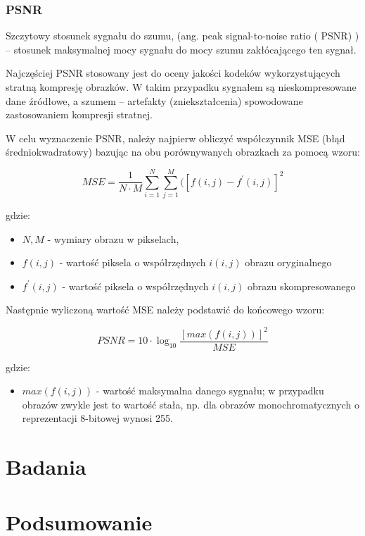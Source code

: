 \documentclass{article}
\begin{document}
\subsubsection{PSNR}

Szczytowy stosunek sygnału do szumu, (ang. peak signal-to-noise ratio ( PSNR) ) – stosunek maksymalnej mocy sygnału do mocy szumu zakłócającego ten sygnał.  

Najczęściej PSNR stosowany jest do oceny jakości kodeków wykorzystujących stratną kompresję obrazków. W takim przypadku sygnałem są nieskompresowane dane źródłowe, a szumem – artefakty (zniekształcenia) spowodowane zastosowaniem kompresji stratnej. 

W celu wyznaczenie PSNR, należy najpierw obliczyć współczynnik MSE (błąd średniokwadratowy) bazując na obu porównywanych obrazkach za pomocą wzoru:

\begin{equation}
MSE = \frac{1}{N \cdot M} \sum_{i=1}^N \sum_{j=1}^M ([f(i, j) - f^{'}(i, j)]^2
\end{equation}

gdzie:
\begin{itemize}[label=]
    \item $N, M$ - wymiary obrazu w pikselach,
    \item $f(i, j)$ - wartość piksela o współrzędnych $i(i, j)$ obrazu oryginalnego
    \item $f^{'}(i, j)$ - wartość piksela o współrzędnych $i(i, j)$ obrazu skompresowanego
\end{itemize}

Następnie wyliczoną wartość MSE należy podstawić do końcowego wzoru: 

\begin{equation}
PSNR = 10 \cdot \log_10 \frac{[max(f(i,j))]^2}{MSE}
\end{equation}

gdzie:
\begin{itemize}[label=]
    \item $max(f(i,j))$ - wartość maksymalna danego sygnału; w przypadku obrazów zwykle jest to wartość stała, np. dla obrazów monochromatycznych o reprezentacji 8-bitowej wynosi 255.
\end{itemize}

\section{Badania}

\section{Podsumowanie}
\end{document}

